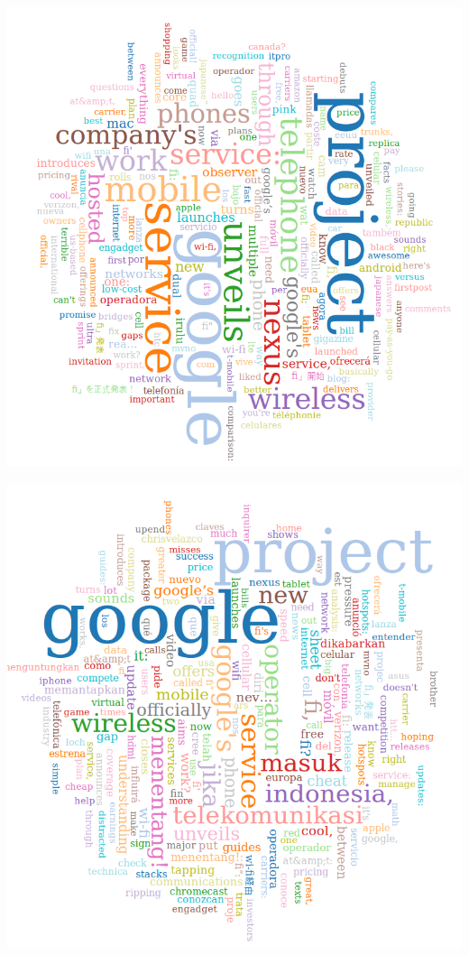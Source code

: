 	\begin{minipage}{\linewidth}
		\centering
			\includegraphics[scale=0.55]{figures/q4/wordCloudDay1}
		\label{wordCount}
	\end{minipage}
	
	\begin{minipage}{\linewidth}
		\centering
			\includegraphics[scale=0.55]{figures/q4/wordCloudDay2}
		\label{wordCount}
	\end{minipage}
	
